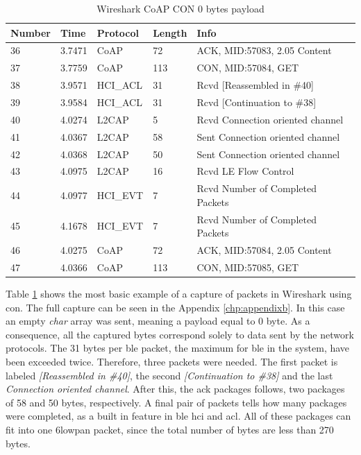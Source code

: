 \begin{table}[ht]
\centering
\caption{Wireshark CoAP CON 0 bytes payload}
\label{coapCON0table}
\begin{tabular}{lllll}
Number & Time   & Protocol & Length & Info                             \\ \hline
36     & 3.7471 & CoAP     & 72     & ACK, MID:57083, 2.05 Content     \\
37     & 3.7759 & CoAP     & 113    & CON, MID:57084, GET              \\
38     & 3.9571 & HCI\_ACL & 31     & Rcvd {[}Reassembled in \#40{]}   \\
39     & 3.9584 & HCI\_ACL & 31     & Rcvd {[}Continuation to \#38{]}  \\
40     & 4.0274 & L2CAP    & 5      & Rcvd Connection oriented channel \\
41     & 4.0367 & L2CAP    & 58     & Sent Connection oriented channel \\
42     & 4.0368 & L2CAP    & 50     & Sent Connection oriented channel \\
43     & 4.0975 & L2CAP    & 16     & Rcvd LE Flow Control             \\
44     & 4.0977 & HCI\_EVT & 7      & Rcvd Number of Completed Packets \\
45     & 4.1678 & HCI\_EVT & 7      & Rcvd Number of Completed Packets \\
46     & 4.0275 & CoAP     & 72     & ACK, MID:57084, 2.05 Content     \\
47     & 4.0366 & CoAP     & 113    & CON, MID:57085, GET              \\ \hline
\end{tabular}
\end{table}

\noindent Table \ref{coapCON0table} shows the most basic example of a capture of packets in Wireshark using \gls{con}. The full capture can be seen in the Appendix \ref{chp:appendixb}. In this case an empty \textit{char} array was sent, meaning a \gls{payload} equal to 0 byte. As a consequence, all the captured bytes correspond solely to data sent by the network protocols. The 31 bytes per \gls{ble} packet, the maximum for \gls{ble} in the system, have been exceeded twice. Therefore, three packets were needed. The first packet is labeled \textit{[Reassembled in \#40]}, the second \textit{[Continuation to \#38]} and the last \textit{Connection oriented channel}. After this, the \gls{ack} packages follows, two packages of 58 and 50 bytes, respectively. A final pair of packets tells how many packages were completed, as a built in feature in \gls{ble}  \gls{hci}  and \gls{acl}. All of these packages can fit into one \gls{6lowpan} packet, since the total number of bytes are less than 270 bytes. 




